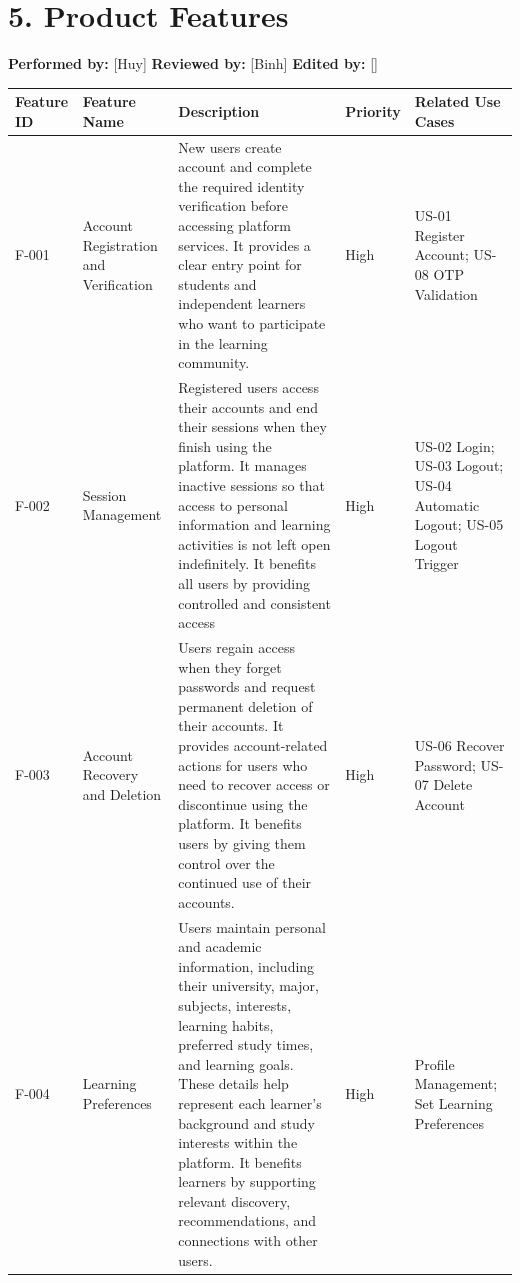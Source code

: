 \documentclass[12pt]{article}
\renewcommand{\baselinestretch}{1.5}
\begin{document}
\section*{5. Product Features}
\par\medskip
\textbf{\textbf{Performed by:}} [Huy] \textbar{} \textbf{\textbf{Reviewed by:}} [Binh] \textbar{} \textbf{\textbf{Edited by:}} []
\par\medskip
\begingroup
\scriptsize
\renewcommand{\baselinestretch}{1.0}\selectfont
\renewcommand{\arraystretch}{1.15}
\setlength{\tabcolsep}{4pt}
\begin{longtable}{|>{\raggedright\arraybackslash}p{}|>{\raggedright\arraybackslash}p{}|>{\raggedright\arraybackslash}p{}|>{\raggedright\arraybackslash}p{}|>{\raggedright\arraybackslash}p{}|}
\hline
Feature ID & Feature Name & Description & Priority & Related Use Cases \\ \hline
\endhead
F-001 & Account Registration and Verification & New users create account and complete the required identity verification before accessing platform services. It provides a clear entry point for students and independent learners who want to participate in the learning community. & High & US-01 Register Account; US-08 OTP Validation \\ \hline
F-002 & Session Management & Registered users access their accounts and end their sessions when they finish using the platform. It manages inactive sessions so that access to personal information and learning activities is not left open indefinitely. It benefits all users by providing controlled and consistent access & High & US-02 Login; US-03 Logout; US-04 Automatic Logout; US-05 Logout Trigger \\ \hline
F-003 & Account Recovery and Deletion & Users regain access when they forget passwords and request permanent deletion of their accounts. It provides account-related actions for users who need to recover access or discontinue using the platform. It benefits users by giving them control over the continued use of their accounts. & High & US-06 Recover Password; US-07 Delete Account \\ \hline
F-004 & Learning Preferences & Users maintain personal and academic information, including their university, major, subjects, interests, learning habits, preferred study times, and learning goals. These details help represent each learner's background and study interests within the platform. It benefits learners by supporting relevant discovery, recommendations, and connections with other users. & High & Profile Management; Set Learning Preferences \\ \hline

\end{longtable}
\end{document}
